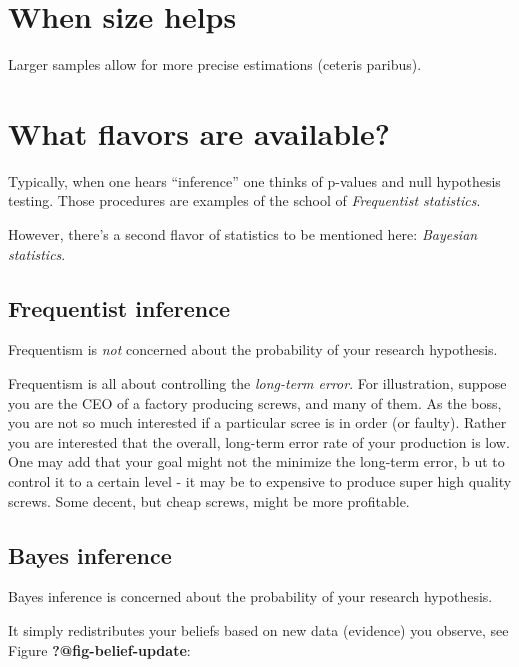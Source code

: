 \documentclass[
  letterpaper,
  DIV=11,
  numbers=noendperiod]{scrreprt}
\theoremstyle{definition}
\theoremstyle{definition}
\theoremstyle{remark}
\begin{document}
\hypertarget{when-size-helps}{%
\section{When size helps}\label{when-size-helps}}

Larger samples allow for more precise estimations (ceteris paribus).

\hypertarget{what-flavors-are-available}{%
\section{What flavors are available?}\label{what-flavors-are-available}}

Typically, when one hears ``inference'' one thinks of p-values and null
hypothesis testing. Those procedures are examples of the school of
\emph{Frequentist statistics}.

However, there's a second flavor of statistics to be mentioned here:
\emph{Bayesian statistics}.

\hypertarget{frequentist-inference}{%
\subsection{Frequentist inference}\label{frequentist-inference}}

Frequentism is \emph{not} concerned about the probability of your
research hypothesis.

Frequentism is all about controlling the \emph{long-term error}. For
illustration, suppose you are the CEO of a factory producing screws, and
many of them. As the boss, you are not so much interested if a
particular scree is in order (or faulty). Rather you are interested that
the overall, long-term error rate of your production is low. One may add
that your goal might not the minimize the long-term error, b ut to
control it to a certain level - it may be to expensive to produce super
high quality screws. Some decent, but cheap screws, might be more
profitable.

\hypertarget{bayes-inference}{%
\subsection{Bayes inference}\label{bayes-inference}}

Bayes inference is concerned about the probability of your research
hypothesis.

It simply redistributes your beliefs based on new data (evidence) you
observe, see Figure \textbf{?@fig-belief-update}:
\end{document}
